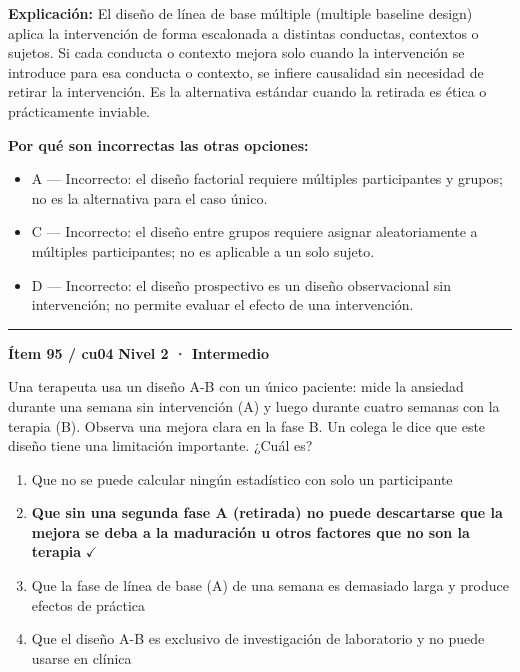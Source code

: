 \documentclass[12pt,a4paper]{article}
\begin{document}
\noindent\textbf{\color{azul}Explicación:} El diseño de línea de base múltiple (multiple baseline design) aplica la intervención de forma escalonada a distintas conductas, contextos o sujetos. Si cada conducta o contexto mejora solo cuando la intervención se introduce para esa conducta o contexto, se infiere causalidad sin necesidad de retirar la intervención. Es la alternativa estándar cuando la retirada es ética o prácticamente inviable.

\noindent\textbf{\color{gris}Por qué son incorrectas las otras opciones:}
\begin{itemize}
  \item {\small A — Incorrecto: el diseño factorial requiere múltiples participantes y grupos; no es la alternativa para el caso único.}
  \item {\small C — Incorrecto: el diseño entre grupos requiere asignar aleatoriamente a múltiples participantes; no es aplicable a un solo sujeto.}
  \item {\small D — Incorrecto: el diseño prospectivo es un diseño observacional sin intervención; no permite evaluar el efecto de una intervención.}
\end{itemize}
\vspace{8pt}\hrule\vspace{10pt}

\begin{mdframed}[backgroundcolor=fondogris,linecolor=ambar,linewidth=1pt,innerleftmargin=10pt,innerrightmargin=10pt,innertopmargin=7pt,innerbottommargin=7pt]
\textbf{Ítem 95 / cu04} \hfill {\small\bfseries\color{ambar} Nivel 2 · Intermedio}
\end{mdframed}

Una terapeuta usa un diseño A-B con un único paciente: mide la ansiedad durante una semana sin intervención (A) y luego durante cuatro semanas con la terapia (B). Observa una mejora clara en la fase B. Un colega le dice que este diseño tiene una limitación importante. ¿Cuál es?

\begin{enumerate}
  \item[A.] Que no se puede calcular ningún estadístico con solo un participante
  \item[\textbf{\color{verde}B.}] \textbf{\color{verde} Que sin una segunda fase A (retirada) no puede descartarse que la mejora se deba a la maduración u otros factores que no son la terapia} \hfill $\checkmark$
  \item[C.] Que la fase de línea de base (A) de una semana es demasiado larga y produce efectos de práctica
  \item[D.] Que el diseño A-B es exclusivo de investigación de laboratorio y no puede usarse en clínica
\end{enumerate}
\end{document}
